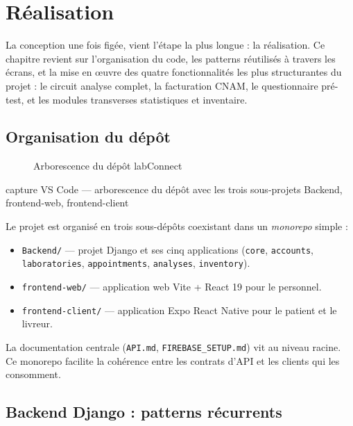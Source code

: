 \documentclass[12pt, a4paper, oneside]{report}
\newcommand{\placeholderFigure}[3][0.75]{%
  \begin{figure}[ht]
    \centering
    \fbox{\begin{minipage}[c][6.5cm][c]{#1\linewidth}
      \centering
      \textit{\small À insérer : #3}
    \end{minipage}}
    \caption{#2}
    \label{fig:#3}
  \end{figure}%
}
\begin{document}
\newpage

\chapter{Réalisation}

\noindent
La conception une fois figée, vient l'étape la plus longue : la
réalisation. Ce chapitre revient sur l'organisation du code, les
patterns réutilisés à travers les écrans, et la mise en \oe{}uvre des
quatre fonctionnalités les plus structurantes du projet : le circuit
analyse complet, la facturation CNAM, le questionnaire pré-test, et
les modules transverses statistiques et inventaire.

\section{Organisation du dépôt}

\placeholderFigure{Arborescence du dépôt labConnect}%
{repo-tree}{capture VS Code — arborescence du dépôt avec les trois
sous-projets Backend, frontend-web, frontend-client}

Le projet est organisé en trois sous-dépôts coexistant dans un
\emph{monorepo} simple :

\begin{itemize}
  \item \texttt{Backend/} — projet Django et ses cinq applications
        (\texttt{core}, \texttt{accounts}, \texttt{laboratories},
        \texttt{appointments}, \texttt{analyses}, \texttt{inventory}).
  \item \texttt{frontend-web/} — application web Vite + React 19
        pour le personnel.
  \item \texttt{frontend-client/} — application Expo React Native
        pour le patient et le livreur.
\end{itemize}

La documentation centrale (\texttt{API.md}, \texttt{FIREBASE\_SETUP.md})
vit au niveau racine. Ce monorepo facilite la cohérence entre les
contrats d'API et les clients qui les consomment.

\section{Backend Django : patterns récurrents}
\end{document}
